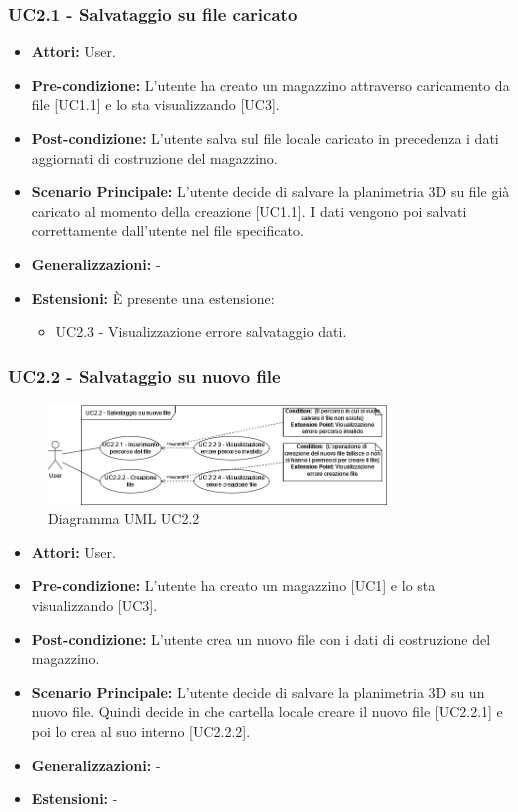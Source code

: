 \subsubsection{UC2.1 - Salvataggio su file caricato}
\begin{itemize}
    \item \textbf{Attori:} User.
    \item \textbf{Pre-condizione:} L'utente ha creato un magazzino attraverso caricamento da file [UC1.1] e lo sta visualizzando [UC3].
    \item \textbf{Post-condizione:} L'utente salva sul file locale caricato in precedenza i dati aggiornati di costruzione del magazzino.
    \item \textbf{Scenario Principale:} L'utente decide di salvare la planimetria 3D su file già caricato al momento della creazione [UC1.1]. I dati vengono poi salvati correttamente dall'utente nel file specificato.
    \item \textbf{Generalizzazioni:} -
    \item \textbf{Estensioni:} È presente una estensione:
    \begin{itemize}
        \item UC2.3 - Visualizzazione errore salvataggio dati.
    \end{itemize}
\end{itemize}


\subsubsection{UC2.2 - Salvataggio su nuovo file}
\begin{figure}[H]
  \centering
  \includegraphics[width=0.8\textwidth]{UC_diagrams_1-10/UC2.2.drawio.png}
   \caption{Diagramma UML UC2.2}
\end{figure}
\begin{itemize}
    \item \textbf{Attori:} User.
    \item \textbf{Pre-condizione:} L'utente ha creato un magazzino [UC1] e lo sta visualizzando [UC3].
    \item \textbf{Post-condizione:} L'utente crea un nuovo file con i dati di costruzione del magazzino.
    \item \textbf{Scenario Principale:} L'utente decide di salvare la planimetria 3D su un nuovo file. Quindi decide in che cartella locale creare il nuovo file [UC2.2.1] e poi lo crea al suo interno [UC2.2.2].
    \item \textbf{Generalizzazioni:} -
    \item \textbf{Estensioni:} -
\end{itemize}


